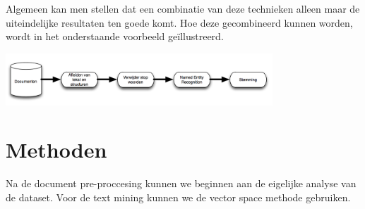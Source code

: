\newline
Algemeen kan men stellen dat een combinatie van deze technieken alleen maar de uiteindelijke resultaten ten goede komt. Hoe deze gecombineerd kunnen worden, wordt in het onderstaande voorbeeld ge\"illustreerd. 
\begin{center}
  \includegraphics[width=10cm]{document_preprocessing}
\end{center}
%
\section{Methoden}\label{Methoden}
Na de document pre-proccesing kunnen we beginnen aan de eigelijke analyse van de dataset. Voor de text mining kunnen we de vector space methode gebruiken.
